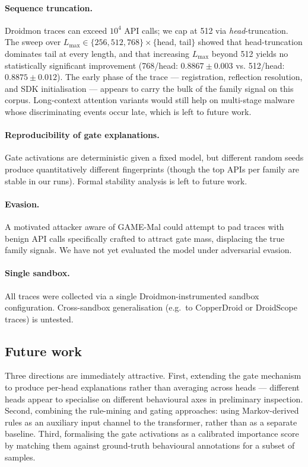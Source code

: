 \paragraph{Sequence truncation.} Droidmon traces can exceed
$10^4$ API calls; we cap at 512 via \emph{head}-truncation. The
sweep over $L_{\max} \in \{256, 512, 768\} \times \{$head, tail$\}$
showed that head-truncation dominates tail at every length, and
that increasing $L_{\max}$ beyond 512 yields no statistically
significant improvement (768/head: $0.8867 \pm 0.003$ vs.
512/head: $0.8875 \pm 0.012$). The early phase of the trace —
registration, reflection resolution, and SDK initialisation — appears
to carry the bulk of the family signal on this corpus. Long-context
attention variants would still help on multi-stage malware whose
discriminating events occur late, which is left to future work.

\paragraph{Reproducibility of gate explanations.} Gate activations
are deterministic given a fixed model, but different random seeds
produce quantitatively different fingerprints (though the top
APIs per family are stable in our runs). Formal stability analysis
is left to future work.

\paragraph{Evasion.} A motivated attacker aware of GAME-Mal could
attempt to pad traces with benign API calls specifically crafted
to attract gate mass, displacing the true family signals. We have
not yet evaluated the model under adversarial evasion.

\paragraph{Single sandbox.} All traces were collected via a single
Droidmon-instrumented sandbox configuration. Cross-sandbox
generalisation (e.g.\ to CopperDroid or DroidScope traces) is
untested.

\subsection{Future work}

Three directions are immediately attractive. First, extending
the gate mechanism to produce per-head explanations rather than
averaging across heads — different heads appear to specialise
on different behavioural axes in preliminary inspection.
Second, combining the rule-mining and gating approaches: using
Markov-derived rules as an auxiliary input channel to the
transformer, rather than as a separate baseline. Third,
formalising the gate activations as a calibrated importance score
by matching them against ground-truth behavioural annotations for
a subset of samples.
